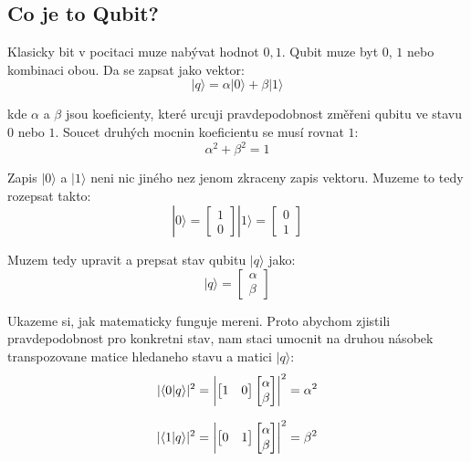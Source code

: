 \documentclass[12pt]{article}
\DeclarePairedDelimiter{\abs}{\lvert}{\rvert}
\begin{document}
\subsection{Co je to Qubit?}
Klasicky bit v pocitaci muze nabývat hodnot ${0, 1}$. Qubit muze byt $0$, $1$ nebo kombinaci obou. Da se zapsat jako vektor:
$$|q\rangle = \alpha|0\rangle + \beta|1\rangle$$
\par kde $\alpha$ a $\beta$ jsou koeficienty, které urcuji pravdepodobnost změřeni qubitu ve stavu $0$ nebo $1$.
Soucet druhých mocnin koeficientu se musí rovnat $1$:
$$\alpha^2 + \beta^2 = 1$$
\par Zapis $|0\rangle$ a $|1\rangle$ neni nic jiného nez jenom zkraceny zapis vektoru.
Muzeme to tedy rozepsat takto:
$$|0\rangle = \begin{bmatrix}
        1 \\
        0
    \end{bmatrix} |1\rangle = \begin{bmatrix}
        0 \\
        1
    \end{bmatrix}  $$
\par Muzem tedy upravit a prepsat stav qubitu $|q\rangle$ jako:
$$|q\rangle = \begin{bmatrix}
        \alpha \\
        \beta
    \end{bmatrix}$$

\par Ukazeme si, jak matematicky funguje mereni.
Proto abychom zjistili pravdepodobnost pro konkretni stav, nam staci umocnit na druhou násobek transpozovane matice hledaneho stavu a matici $|q\rangle$:
$$|\langle 0 | q \rangle|^2 = \abs*{\begin{bmatrix}
            1 & 0
        \end{bmatrix}\begin{bmatrix}
            \alpha \\
            \beta
        \end{bmatrix}}^2 = \alpha ^ 2$$

$$|\langle 1 | q \rangle|^2 = \abs*{\begin{bmatrix}
            0 & 1
        \end{bmatrix}\begin{bmatrix}
            \alpha \\
            \beta
        \end{bmatrix}}^2 = \beta ^ 2$$
\end{document}
